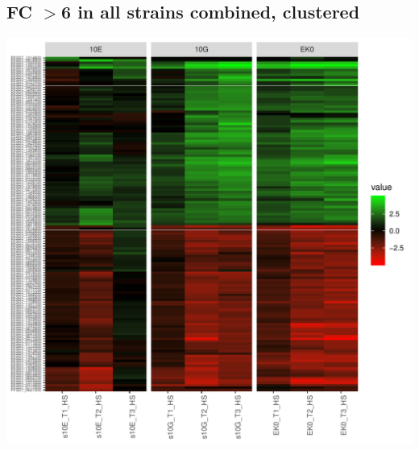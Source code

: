 \documentclass{article}\usepackage[]{graphicx}\usepackage[]{color}
\newenvironment{knitrout}{}{} %
\begin{document}
\subsection{FC $>$6 in all strains combined, clustered}
\begin{knitrout}
\color{fgcolor}

{\centering \includegraphics[width=1\linewidth]{figure/minimal-heatmap_all_clustered-1} 

}



\end{knitrout}






\clearpage
\end{document}
